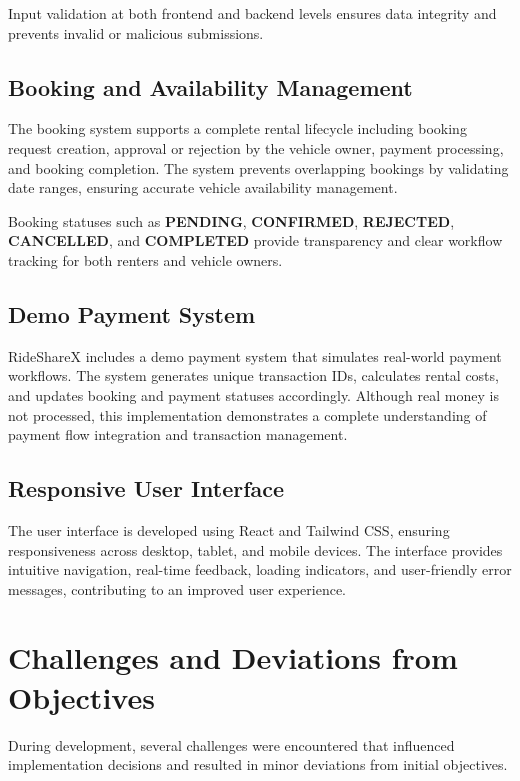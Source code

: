 \documentclass[12pt,a4paper]{report}
\begin{document}
Input validation at both frontend and backend levels ensures data integrity and prevents invalid or malicious submissions.

\subsection{Booking and Availability Management}

The booking system supports a complete rental lifecycle including booking request creation, approval or rejection by the vehicle owner, payment processing, and booking completion. The system prevents overlapping bookings by validating date ranges, ensuring accurate vehicle availability management.

Booking statuses such as \textbf{PENDING}, \textbf{CONFIRMED}, \textbf{REJECTED}, \textbf{CANCELLED}, and \textbf{COMPLETED} provide transparency and clear workflow tracking for both renters and vehicle owners.

\subsection{Demo Payment System}

RideShareX includes a demo payment system that simulates real-world payment workflows. The system generates unique transaction IDs, calculates rental costs, and updates booking and payment statuses accordingly. Although real money is not processed, this implementation demonstrates a complete understanding of payment flow integration and transaction management.

\subsection{Responsive User Interface}

The user interface is developed using React\cite{react} and Tailwind CSS\cite{tailwind}, ensuring responsiveness across desktop, tablet, and mobile devices. The interface provides intuitive navigation, real-time feedback, loading indicators, and user-friendly error messages, contributing to an improved user experience.

\section{Challenges and Deviations from Objectives}

During development, several challenges were encountered that influenced implementation decisions and resulted in minor deviations from initial objectives.
\end{document}
